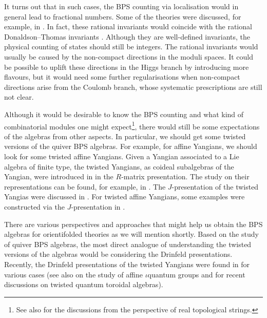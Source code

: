 \documentclass[11pt]{article}
\numberwithin{equation}{section}
\numberwithin{figure}{section}
\numberwithin{table}{section}
\begin{document}
It turns out that in such cases, the BPS counting via localisation would in general lead to fractional numbers. Some of the theories were discussed, for example, in \cite{Yi:1997eg,Lee:2016dbm,Lee:2017lfw}. In fact, these rational invariants would coincide with the rational Donaldson--Thomas invariants \cite{Joyce:2008pc,Young:2014eqa,Young:2016vjz,Franzen:2016czs,bu2023enumerativeI,bu2023enumerativeII,Bu:2025nmp}. Although they are well-defined invariants, the physical counting of states should still be integers. The rational invariants would usually be caused by the non-compact directions in the moduli spaces. It could be possible to uplift these directions in the Higgs branch by introducing more flavours, but it would need some further regularisations when non-compact directions arise from the Coulomb branch, whose systematic prescriptions are still not clear.

Although it would be desirable to know the BPS counting and what kind of combinatorial modules one might expect\footnote{See also \cite{Krefl:2009mw,Krefl:2010sz} for the discussions from the perspective of real topological strings.}, there would still be some expectations of the algebras from other aspects. In particular, we should get some twisted versions of the quiver BPS algebras. For example, for affine Yangians, we should look for some twisted affine Yangians. Given a Yangian associated to a Lie algebra of finite type, the twisted Yangians, as coideal subalgebras of the Yangian, were introduced in \cite{molev2002representations,olshanskii2006twisted,guay2016twisted} in the $R$-matrix presentation. The study on their representations can be found, for example, in \cite{Molev:1994rs,nazarov2004representations,MacKay:2002at,guay2017representations,lu2025twisted}. The $J$-presentation of the twisted Yangias were discussed in \cite{Belliard:2014uja}. For twisted affine Yangians, some examples were constructed via the $J$-presentation in \cite{ueda2025twisted,harako2026new}.

There are various perspectives and approaches that might help us obtain the BPS algebras for orientifolded theories as we will mention shortly. Based on the study of quiver BPS algebras, the most direct analogue of understanding the twisted versions of the algebras would be considering the Drinfeld presentations. Recently, the Drinfeld presentations of the twisted Yangians were found in \cite{lu2025affine,Lu_2025,2024arXiv240806981L,Lu_2026,lu2026twisted,huang2026quasi,lu2026classification} for various cases (see also \cite{lu2021drinfeld,zhang2022drinfeld,lu2024isomorphism,lu2025affine,lu2026shifted} on the study of affine $\iota$quantum groups and \cite{neguct2026folding} for recent discussions on twisted quantum toroidal algebras).
\end{document}
